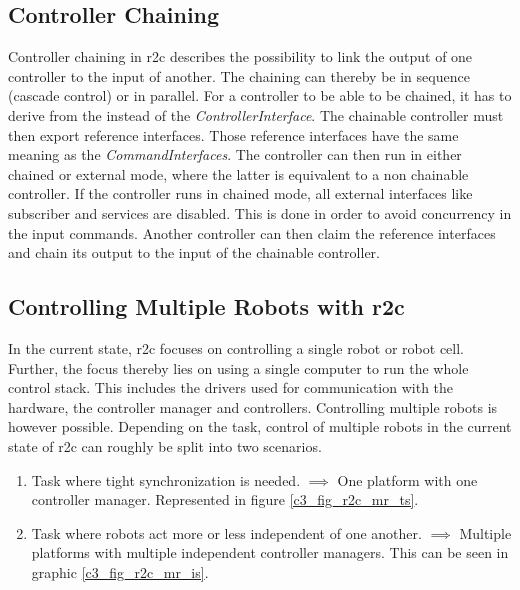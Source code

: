 \subsection{Controller Chaining}
Controller chaining in \gls{r2c} describes the possibility to link the output of one controller to the input of another. The chaining can thereby be in sequence (cascade control) or in parallel.\newline
For a controller to be able to be chained, it has to derive from the \textit{} instead of the \textit{ControllerInterface}. The chainable controller must then export reference interfaces. Those reference interfaces have the same meaning as the \textit{CommandInterfaces}. The controller can then run in either chained or external mode, where the latter is equivalent to a non chainable controller. If the controller runs in chained mode, all external interfaces like subscriber and services are disabled. This is done in order to avoid concurrency in the input commands. Another controller can then claim the reference interfaces and chain its output to the input of the chainable controller.

\subsection{Controlling Multiple Robots with \gls{r2c}}\label{c3_sec_controlling_multiple_robots}
In the current state, \gls{r2c} focuses on controlling a single robot or robot cell. Further, the focus thereby lies on using a single computer to run the whole control stack. This includes the drivers used for communication with the hardware, the controller manager and controllers.\newline
Controlling multiple robots is however possible. Depending on the task, control of multiple robots in the current state of \gls{r2c} can roughly be split into two scenarios.
\begin{enumerate}[start=1,label={\upshape \texttt{Scenario \arabic*:}},wide = 0pt, leftmargin = 3em]
    \item Task where tight synchronization is needed. $\implies$ One platform with one controller manager. Represented in figure \ref{c3_fig_r2c_mr_ts}.
    \item Task where robots act more or less independent of one another. $\implies$ Multiple platforms with multiple independent controller managers. This can be seen in graphic \ref{c3_fig_r2c_mr_is}.
\end{enumerate}

